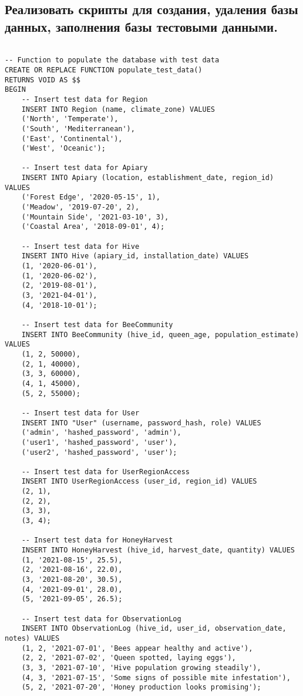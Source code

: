 \documentclass{article}
\begin{document}
\subsection{Реализовать скрипты для создания, удаления базы данных, заполнения базы тестовыми данными.}

\begin{lstlisting}

-- Function to populate the database with test data
CREATE OR REPLACE FUNCTION populate_test_data()
RETURNS VOID AS $$
BEGIN
    -- Insert test data for Region
    INSERT INTO Region (name, climate_zone) VALUES
    ('North', 'Temperate'),
    ('South', 'Mediterranean'),
    ('East', 'Continental'),
    ('West', 'Oceanic');

    -- Insert test data for Apiary
    INSERT INTO Apiary (location, establishment_date, region_id) VALUES
    ('Forest Edge', '2020-05-15', 1),
    ('Meadow', '2019-07-20', 2),
    ('Mountain Side', '2021-03-10', 3),
    ('Coastal Area', '2018-09-01', 4);

    -- Insert test data for Hive
    INSERT INTO Hive (apiary_id, installation_date) VALUES
    (1, '2020-06-01'),
    (1, '2020-06-02'),
    (2, '2019-08-01'),
    (3, '2021-04-01'),
    (4, '2018-10-01');

    -- Insert test data for BeeCommunity
    INSERT INTO BeeCommunity (hive_id, queen_age, population_estimate) VALUES
    (1, 2, 50000),
    (2, 1, 40000),
    (3, 3, 60000),
    (4, 1, 45000),
    (5, 2, 55000);

    -- Insert test data for User
    INSERT INTO "User" (username, password_hash, role) VALUES
    ('admin', 'hashed_password', 'admin'),
    ('user1', 'hashed_password', 'user'),
    ('user2', 'hashed_password', 'user');

    -- Insert test data for UserRegionAccess
    INSERT INTO UserRegionAccess (user_id, region_id) VALUES
    (2, 1),
    (2, 2),
    (3, 3),
    (3, 4);

    -- Insert test data for HoneyHarvest
    INSERT INTO HoneyHarvest (hive_id, harvest_date, quantity) VALUES
    (1, '2021-08-15', 25.5),
    (2, '2021-08-16', 22.0),
    (3, '2021-08-20', 30.5),
    (4, '2021-09-01', 28.0),
    (5, '2021-09-05', 26.5);

    -- Insert test data for ObservationLog
    INSERT INTO ObservationLog (hive_id, user_id, observation_date, notes) VALUES
    (1, 2, '2021-07-01', 'Bees appear healthy and active'),
    (2, 2, '2021-07-02', 'Queen spotted, laying eggs'),
    (3, 3, '2021-07-10', 'Hive population growing steadily'),
    (4, 3, '2021-07-15', 'Some signs of possible mite infestation'),
    (5, 2, '2021-07-20', 'Honey production looks promising');


\end{lstlisting}
\end{document}
